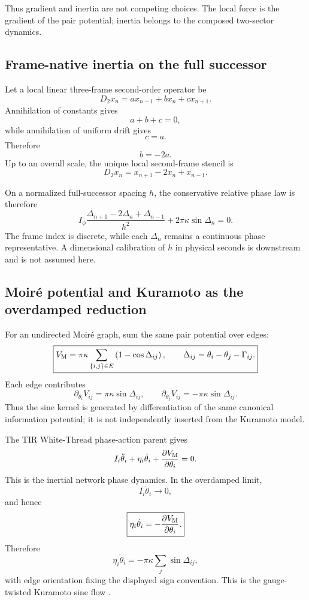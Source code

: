 \documentclass[11pt]{article}
\begin{document}
Thus gradient and inertia are not competing choices. The local force is the
gradient of the pair potential; inertia belongs to the composed two-sector
dynamics.

\subsection{Frame-native inertia on the full successor}

Let a local linear three-frame second-order operator be
\[
D_2x_n
=
a x_{n-1}+b x_n+c x_{n+1}.
\]
Annihilation of constants gives
\[
a+b+c=0,
\]
while annihilation of uniform drift gives
\[
c=a.
\]
Therefore
\[
b=-2a.
\]
Up to an overall scale, the unique local second-frame stencil is
\[
\boxed{
D_2x_n=x_{n+1}-2x_n+x_{n-1}.
}
\]

On a normalized full-successor spacing \(h\), the conservative relative
phase law is therefore
\[
\boxed{
I_\phi
\frac{
\Delta_{n+1}-2\Delta_n+\Delta_{n-1}
}{h^2}
+
2\pi\kappa\sin\Delta_n
=
0.
}
\]
The frame index is discrete, while each \(\Delta_n\) remains a continuous
phase representative. A dimensional calibration of \(h\) in physical
seconds is downstream and is not assumed here.

\subsection{Moir\'e potential and Kuramoto as the overdamped reduction}

For an undirected Moir\'e graph, sum the same pair potential over edges:
\[
\boxed{
V_{\rm M}
=
\pi\kappa
\sum_{\{i,j\}\in E}
\left(
1-\cos\Delta_{ij}
\right),
\qquad
\Delta_{ij}
=
\theta_i-\theta_j-\Gamma_{ij}.
}
\]
Each edge contributes
\[
\partial_{\theta_i}V_{ij}
=
\pi\kappa\sin\Delta_{ij},
\qquad
\partial_{\theta_j}V_{ij}
=
-\pi\kappa\sin\Delta_{ij}.
\]
Thus the sine kernel is generated by differentiation of the same canonical
information potential; it is not independently inserted from the Kuramoto
model.

The TIR White-Thread phase-action parent gives
\cite{LipaTIRWhiteThread2026}
\[
I_i\ddot\theta_i
+
\eta_i\dot\theta_i
+
\frac{\partial V_{\rm M}}{\partial\theta_i}
=
0.
\]
This is the inertial network phase dynamics. In the overdamped limit,
\[
I_i\ddot\theta_i\to0,
\]
and hence
\[
\boxed{
\eta_i\dot\theta_i
=
-
\frac{\partial V_{\rm M}}{\partial\theta_i}.
}
\]
Therefore
\[
\boxed{
\eta_i\dot\theta_i
=
-\pi\kappa
\sum_j
\sin\Delta_{ij},
}
\]
with edge orientation fixing the displayed sign convention. This is the
gauge-twisted Kuramoto sine flow \cite{Kuramoto1984}.
\end{document}
